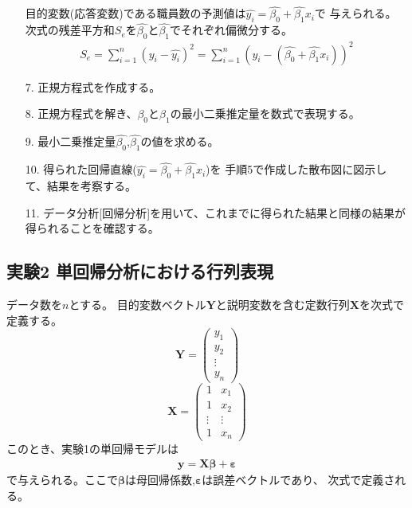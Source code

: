 \documentclass[12pt]{jarticle}
\begin{document}
\begin{itemize}
          目的変数(応答変数)である職員数の予測値は$\hat{y_i}=\hat{\beta_0}+\hat{\beta_1}x_i$で
          与えられる。
          次式の残差平方和$S_e$を$\hat{\beta_0}$と$\hat{\beta_1}$でそれぞれ偏微分する。
          \begin{eqnarray}
              S_e=\sum_{i=1}^{n} (y_i-\hat{y_i})^2 = \sum_{i=1}^{n} (y_i-(\hat{\beta_0}+\hat{\beta_1}x_i))^2
          \end{eqnarray}
    \item [7.]正規方程式を作成する。
    \item [8.]正規方程式を解き、$\beta_0$と$\beta_1$の最小二乗推定量を数式で表現する。
    \item [9.]最小二乗推定量$\hat{\beta_0}$,$\hat{\beta_1}$の値を求める。
    \item [10.]得られた回帰直線($\hat{y_i}=\hat{\beta_0}+\hat{\beta_1}x_i$)を
          手順5で作成した散布図に図示して、結果を考察する。
    \item [11.]データ分析[回帰分析]を用いて、これまでに得られた結果と同様の結果が得られることを確認する。
\end{itemize}

\clearpage

\subsection{実験2 単回帰分析における行列表現}
データ数を$n$とする。
目的変数ベクトル$\bm Y$と説明変数を含む定数行列$\bm X$を次式で定義する。
\[
    \bm Y = \left(
    \begin{array}{c}
            y_1    \\
            y_2    \\
            \vdots \\
            y_n
        \end{array}
    \right)
\]
\[
    \bm X = \left(
    \begin{array}{cc}
            1      & x_1    \\
            1      & x_2    \\
            \vdots & \vdots \\
            1      & x_n
        \end{array}
    \right)
\]
このとき、実験1の単回帰モデルは
\begin{eqnarray}
    \bm y=\bm X \bm \beta+ \bm \varepsilon \nonumber
\end{eqnarray}
で与えられる。ここで$\bm \beta$は母回帰係数,$ \bm \varepsilon$は誤差ベクトルであり、
次式で定義される。
\end{document}
